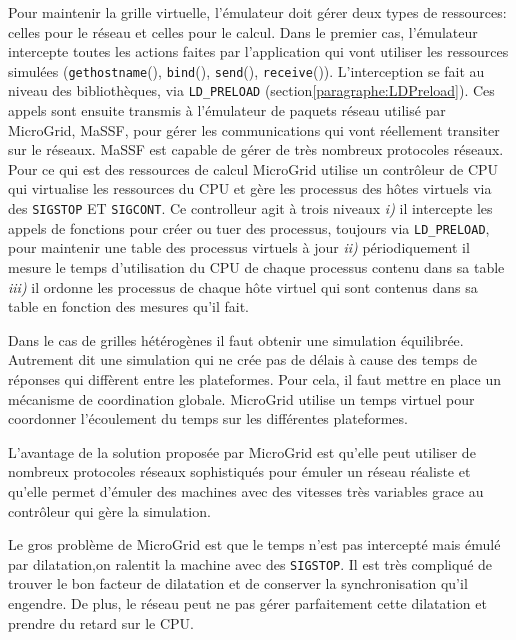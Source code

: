 Pour maintenir la grille virtuelle, l'émulateur doit gérer deux types de ressources: celles pour le réseau et celles pour le calcul. Dans le premier cas, l'émulateur intercepte toutes les actions faites par l'application qui vont utiliser les ressources simulées (\texttt{gethostname}(), \texttt{bind}(), \texttt{send}(), \texttt{receive}()). L'interception se fait au niveau des bibliothèques, via \texttt{LD\_PRELOAD} (section\ref{paragraphe:LDPreload}). Ces appels sont ensuite transmis à l'émulateur de paquets réseau utilisé par MicroGrid, MaSSF, pour gérer les communications qui vont réellement transiter sur le réseaux. MaSSF est capable de gérer de très nombreux protocoles réseaux.  Pour ce qui est des ressources de calcul MicroGrid utilise un contrôleur de CPU qui virtualise les ressources du CPU et gère les processus des hôtes virtuels via des \texttt{SIGSTOP} ET \texttt{SIGCONT}. Ce controlleur agit à trois niveaux \textit{i)} il intercepte les appels de fonctions pour créer ou tuer des processus, toujours via \texttt{LD\_PRELOAD}, pour maintenir une table des processus virtuels à jour \textit{ii)} périodiquement il mesure le temps d'utilisation du CPU de chaque processus contenu dans sa table \textit{iii)} il ordonne les processus de chaque hôte virtuel qui sont contenus dans sa table en fonction des mesures qu'il fait.

Dans le cas de grilles hétérogènes il faut obtenir une simulation équilibrée. Autrement dit une simulation qui ne crée pas de délais à cause des temps de réponses qui diffèrent entre les plateformes. Pour cela, il faut mettre en place un mécanisme de coordination globale. MicroGrid utilise un temps virtuel pour coordonner l'écoulement du temps sur les différentes plateformes.

L'avantage de la solution proposée par MicroGrid est qu'elle peut utiliser de nombreux protocoles réseaux sophistiqués pour émuler un réseau réaliste et qu'elle permet d'émuler des machines avec des vitesses très variables grace au contrôleur qui gère la simulation.

Le gros problème de MicroGrid est que le temps n'est pas intercepté mais émulé par dilatation,on ralentit la machine avec des \texttt{SIGSTOP}. Il est très compliqué de trouver le bon facteur de dilatation et de conserver la synchronisation qu'il engendre. De plus, le réseau peut ne pas gérer parfaitement cette dilatation et prendre du retard sur le CPU.

